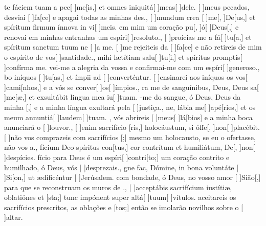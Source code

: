 {  %
  {te fáciem tuam a pec[ ]{me}[is,] et omnes iniquitá[ ]{me}{as}[ ]{de}le.}%
    {[ ]{meus} pecados, desviai [ ]{fa}[ce] e apagai todas as minhas des.},
  {[ ]{mun}dum crea [ ]{me}[, ]{De}[us,] et spíritum firmum ínnova in vi[ ]{me}is.}%
    { em mim um coração pu[, ]{ó}[ ]{Deus}[,] e renovai em minhas entranhas um espíri[ ]{re}{so}{lu}to.},
  {[ ]{pro}ícias me a fá[ ]{tu}[a,] et spíritum sanctum tuum ne [ ]{a} me.}%
    {[ ]{me} rejeiteis da [ ]{fa}[ce] e não retireis de mim o espírito de vos[ ]{san}{ti}{da}de.},
  { mihi lætítiam salu[ ]{tu}[i,] et spíritus promptís[ ]{con}{fírma} me.}%
    {vei-me a alegria da vossa  e confir\-mai-me com um espíri[ ]{ge}{ne}{ro}so.},
  {bo iníquos [ ]{tu}[as,] et ímpii ad [ ]{con}{ver}{tén}{\-tur.}}%
    {[ ]{en}sinarei aos iníquos os vos[ ]{ca}{mi}[nhos,] e a vós se conver[ ]{os}[ ]{ím}pios.},
  {ra me de sanguínibus, Deus, Deus sa[ ]{me}[æ,] et exsultábit lingua mea iu[ ]{tu}am.}%
    {-me do sangue, ó Deus, Deus da minha [,] e a minha língua exultará pela [ ]{jus}{ti}ça.},
  {ne, lábia me[ ]{a}{pé}[ries,] et os meum annuntiá[ ]{lau}{dem}[ ]{tu}am.}%
    {, vós abrireis [ ]{meus}[ ]{lá}[bios] e a minha boca anunciará o [ ]{lou}{vor}.},
  {[ ]{e}nim sacrifício [ris,] holocáustum, si óffe[, ]{non}[ ]{pla}{cé}bit.}%
    {[ ]{não} vos comprazeis com sacrifícios [;] mesmo um holocausto, se eu o ofertasse, não vos a.},
  {fícium Deo spíritus con[tus,] cor contrítum et humiliátum, De[, ]{non}[ ]{de}{spíci}es.}%
    {fício para Deus é um espíri[ ]{con}{tri}[to;] um coração contrito e humilhado, ó Deus, vós [ ]{des}{pre}{zais}.},
  {gne fac, Dómine, in bona voluntáte [ ]{Si}[on,] ut ædificéntur [ ]{Je}{rúsa}lem.}%
    { com bondade, ó Deus, no vosso amor [ ]{Si}{ão}[,] para que se reconstruam os muros de .},
  {[ ]{ac}ceptábis sacrifícium iustítiæ, oblatiónes et [\-sta;] tunc impónent super altá[ ]{tu}{um}[ ]{vítu}\-los.}%
    { aceitareis os sacrifícios prescritos, as oblações e [tos;] então se imolarão novilhos sobre o [ ]{al}{tar}.}
}